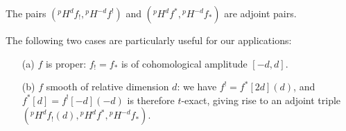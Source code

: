 \begin{corollary}\label{scheme perverse morphism adjunction of * !}
The pairs $({^p\!H^df_!},{^p\!H^{-d}f^!})$ and $({^p\!H^df^*},{^p\!H^{-d}f_*})$ are adjoint pairs.
\end{corollary}

The following two cases are particularly useful for our applications:
\begin{enumerate}
    \item[(a)] $f$ is proper: $f_!=f_*$ is of cohomological amplitude $[-d,d]$.
    \item[(b)] $f$ smooth of relative dimension $d$: we have $f^!=f^*[2d](d)$, and $f^*[d]=f^![-d](-d)$ is therefore $t$-exact, giving rise to an adjoint triple $({^p\!H^df_!(d)},{^p\!H^df^*},{^p\!H^{-d}f_*})$. 
\end{enumerate}

